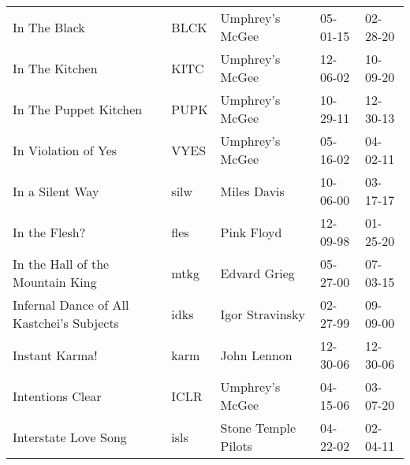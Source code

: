 \begin{longtable}{p{}p{}p{}p{}p{}}
                                                            In The Black &          BLCK &                                          Umphrey's McGee &              05-01-15 &             02-28-20 \\
                                                          In The Kitchen &          KITC &                                          Umphrey's McGee &              12-06-02 &             10-09-20 \\
                                                   In The Puppet Kitchen &          PUPK &                                          Umphrey's McGee &              10-29-11 &             12-30-13 \\
                                                     In Violation of Yes &          VYES &                                          Umphrey's McGee &              05-16-02 &             04-02-11 \\
                                                         In a Silent Way &          silw &                                              Miles Davis &              10-06-00 &             03-17-17 \\
                                                           In the Flesh? &          fles &                                               Pink Floyd &              12-09-98 &             01-25-20 \\
                                        In the Hall of the Mountain King &          mtkg &                                             Edvard Grieg &              05-27-00 &             07-03-15 \\
                               Infernal Dance of All Kastchei's Subjects &          idks &                                          Igor Stravinsky &              02-27-99 &             09-09-00 \\
                                                          Instant Karma! &          karm &                                              John Lennon &              12-30-06 &             12-30-06 \\
                                                        Intentions Clear &          ICLR &                                          Umphrey's McGee &              04-15-06 &             03-07-20 \\
                                                    Interstate Love Song &          isls &                                      Stone Temple Pilots &              04-22-02 &             02-04-11 \\

\end{longtable}
